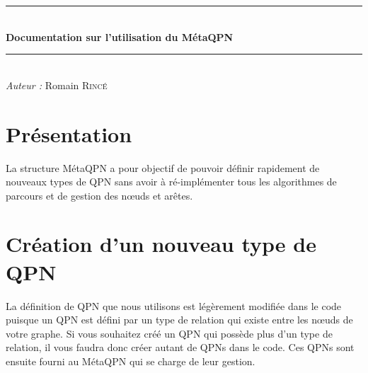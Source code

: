 \documentclass[11pt, a4paper]{article}
\newcommand{\reporttitle}{Documentation sur l'utilisation du MétaQPN}     %
\newcommand{\reportauthor}{Romain \textsc{Rincé}} %
\newcommand{\reportsubject}{} %
\newcommand{\HRule}{\rule{\linewidth}{0.3mm}}
\begin{document}
\begin{center}




\HRule \\[0.3cm]
{\bfseries \reporttitle}\\[0.3cm]
\HRule \\[2ex]
\emph{Auteur : } \reportauthor
%   
%
%

\end{center}


  

%	
%    
%    
%
%
%
\section{Présentation}
La structure MétaQPN a pour objectif de pouvoir définir rapidement de nouveaux types de QPN sans avoir à ré-implémenter tous les algorithmes de parcours et de gestion des nœuds et arêtes.


\section{Création d'un nouveau type de QPN}
La définition de QPN que nous utilisons est légèrement modifiée dans le code puisque un QPN est défini par un type de relation qui existe entre les nœuds de votre graphe. Si vous souhaitez créé un QPN qui possède plus d'un type de relation, il vous faudra donc créer autant de QPNs dans le code. Ces QPNs sont ensuite fourni au MétaQPN qui se charge de leur gestion. 
\end{document}
